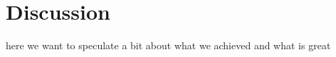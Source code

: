 \section{Discussion}
\label{sec:discussion}
here we want to speculate a bit about what we achieved and what is great
